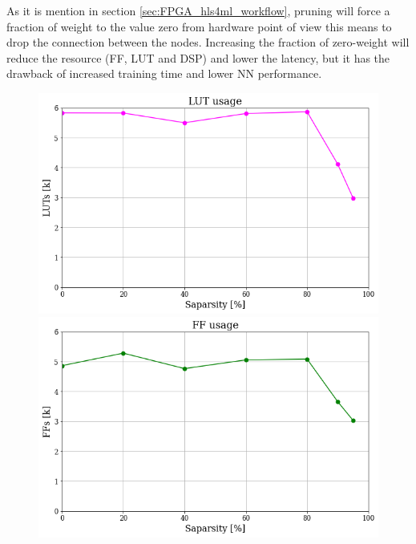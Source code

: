 \documentclass[../../main.tex]{subfiles}
\begin{document}
As it is mention in section \ref{sec:FPGA_hls4ml_workflow}, pruning will force a fraction of weight to the value zero from hardware point of view this means to drop the connection between the nodes. Increasing the fraction of zero-weight will reduce the resource (FF, LUT and DSP) and lower the latency, but it has the drawback of increased training time and lower NN performance.

\begin{figure}[h] 
  \label{ fig7} 
  \begin{minipage}[b]{0.5\linewidth}
    \centering
    \includegraphics[width=.9\linewidth]{sections/05/Images/Prune_LUT_1ele.png} 
    \vspace{2ex}
  \end{minipage}%
  \begin{minipage}[b]{0.5\linewidth}
    \centering
    \includegraphics[width=.9\linewidth]{sections/05/Images/Prune_FF_1ele.png}
    \vspace{2ex}
  \end{minipage} 
  \begin{minipage}[b]{0.5\linewidth}

\end{minipage}
\end{figure}
\end{document}
